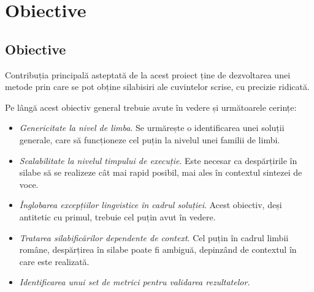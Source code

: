 \chapter{Obiective}
\label{cap:obiective-specificatii}
\section{Obiective}
Contribuția principală asteptată de la acest proiect ține de dezvoltarea unei metode prin care se pot obține silabisiri ale cuvintelor scrise, cu precizie ridicată. 

Pe lângă acest obiectiv general trebuie avute în vedere și următoarele cerințe: 

\begin{itemize}
\item \textit{Genericitate la nivel de limba}. Se urmărește o identificarea unei soluții generale, care să funcționeze cel puțin la nivelul unei familii de limbi.
\item \textit{Scalabilitate la nivelul timpului de execuție}. Este necesar ca despărțirile în silabe să se realizeze cât mai rapid posibil, mai ales în contextul sintezei de voce. 
\item \textit{Înglobarea excepțiilor lingvistice în cadrul soluției}. Acest obiectiv, deși antitetic cu primul, trebuie cel puțin avut în vedere.
\item \textit{Tratarea silabificărilor dependente de context}. Cel puțin în cadrul limbii române, despărțirea în silabe poate fi ambiguă, depinzând de contextul în care este realizată.
\item \textit{Identificarea unui set de metrici pentru validarea rezultatelor.}

\end{itemize}
